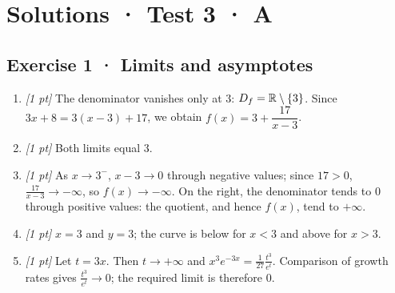 \ifprof\clearpage

\section*{Solutions · Test 3 · A}\label{cor:4-3}

\subsection*{Exercise 1 · Limits and asymptotes}\begin{enumerate}

\item \textit{[1 pt]} The denominator vanishes only at $3$: $D_f=\mathbb R\setminus\{3\}$. Since $3x+8=3(x-3)+17$, we obtain $f(x)=3+\dfrac{17}{x-3}$.

\item \textit{[1 pt]} Both limits equal $3$.

\item \textit{[1 pt]} As $x\to 3^-$, $x-3\to0$ through negative values; since $17>0$, $\frac{17}{x-3}\to-\infty$, so $f(x)\to-\infty$. On the right, the denominator tends to $0$ through positive values: the quotient, and hence $f(x)$, tend to $+\infty$.

\item \textit{[1 pt]} $x=3$ and $y=3$; the curve is below for $x<3$ and above for $x>3$.

\item \textit{[1 pt]} Let $t=3x$. Then $t\to+\infty$ and $x^3e^{-3x}=\frac{1}{27}\frac{t^3}{e^t}$. Comparison of growth rates gives $\frac{t^3}{e^t}\to0$; the required limit is therefore $0$.

\end{enumerate}

